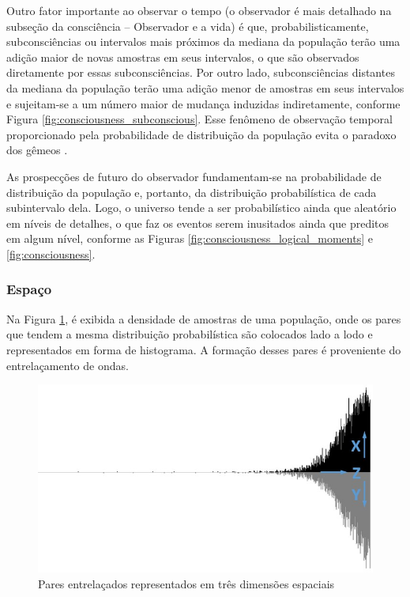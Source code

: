 Outro fator importante ao observar o tempo (o observador é mais detalhado na subseção da consciência – Observador e a vida) é que, probabilisticamente, subconsciências ou intervalos mais próximos da mediana da população terão uma adição maior de novas amostras em seus intervalos, o que são observados diretamente por essas subconsciências. Por outro lado, subconsciências distantes da mediana da população terão uma adição menor de amostras em seus intervalos e sujeitam-se a um número maior de mudança induzidas indiretamente, conforme Figura \ref{fig:consciousness_subconscious}. Esse fenômeno de observação temporal proporcionado pela probabilidade de distribuição da população evita o paradoxo dos gêmeos \cite{brasilescola_paradoxo_gemeos}.

As prospecções de futuro do observador fundamentam-se na probabilidade de distribuição da população e, portanto, da distribuição probabilística de cada subintervalo dela. Logo, o universo tende a ser probabilístico ainda que aleatório em níveis de detalhes, o que faz os eventos serem inusitados ainda que preditos em algum nível, conforme as Figuras \ref{fig:consciousness_logical_moments} e \ref{fig:consciousness}. 

\subsubsection{Espaço}
Na Figura \ref{fig:consciousness_space_waves}, é exibida a densidade de amostras de uma população, onde os pares que tendem a mesma distribuição probabilística são colocados lado a lodo e representados em forma de histograma. A formação desses pares é proveniente do entrelaçamento de ondas.
	\begin{figure}[H]
	\caption{Pares entrelaçados representados em três dimensões espaciais}
	\label{fig:consciousness_space_waves}
	\centering
	\includegraphics[scale=.7]{sections/images/consciousness_space_waves.jpg}
	\end{figure}

